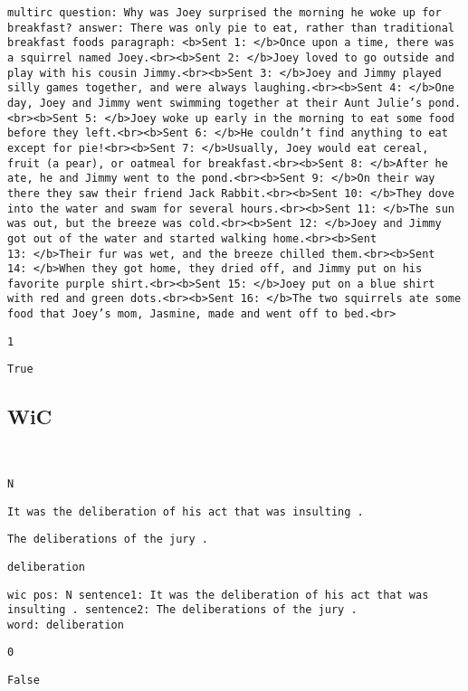 \documentclass[twoside,11pt]{article}
\begin{document}
\begin{description}[leftmargin=0.5cm]
\item[Processed input:] \texttt{multirc question:\ Why was Joey surprised the morning he woke up for breakfast? answer:\ There was only pie to eat, rather than traditional breakfast foods paragraph:\ <b>Sent 1:\ </b>Once upon a time, there was a squirrel named Joey.<br><b>Sent 2:\ </b>Joey loved to go outside and play with his cousin Jimmy.<br><b>Sent 3:\ </b>Joey and Jimmy played silly games together, and were always laughing.<br><b>Sent 4:\ </b>One day, Joey and Jimmy went swimming together at their Aunt Julie's pond.<br><b>Sent 5:\ </b>Joey woke up early in the morning to eat some food before they left.<br><b>Sent 6:\ </b>He couldn't find anything to eat except for pie!<br><b>Sent 7:\ </b>Usually, Joey would eat cereal, fruit (a pear), or oatmeal for breakfast.<br><b>Sent 8:\ </b>After he ate, he and Jimmy went to the pond.<br><b>Sent 9:\ </b>On their way there they saw their friend Jack Rabbit.<br><b>Sent 10:\ </b>They dove into the water and swam for several hours.<br><b>Sent 11:\ </b>The sun was out, but the breeze was cold.<br><b>Sent 12:\ </b>Joey and Jimmy got out of the water and started walking home.<br><b>Sent 13:\ </b>Their fur was wet, and the breeze chilled them.<br><b>Sent 14:\ </b>When they got home, they dried off, and Jimmy put on his favorite purple shirt.<br><b>Sent 15:\ </b>Joey put on a blue shirt with red and green dots.<br><b>Sent 16:\ </b>The two squirrels ate some food that Joey's mom, Jasmine, made and went off to bed.<br>}
\item[Original target:] \texttt{1}
\item[Processed target:] \texttt{True}
\end{description}

\subsection{WiC}
\begin{description}[leftmargin=0.5cm]
\item[Original input:] ~
\begin{description}[leftmargin=0.5cm]
  \item[POS:] \texttt{N}
  \item[Sentence 1:] \texttt{It was the deliberation of his act that was insulting .}
  \item[Sentence 2:] \texttt{The deliberations of the jury .}
  \item[Word:] \texttt{deliberation}
\end{description}
\item[Processed input:] \texttt{wic pos:\ N sentence1:\ It was the deliberation of his act that was insulting . sentence2:\ The deliberations of the jury . word:\ deliberation}
\item[Original target:] \texttt{0}
\item[Processed target:] \texttt{False}
\end{description}
\end{document}
